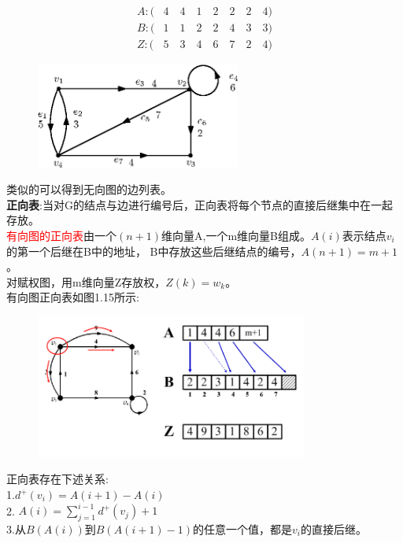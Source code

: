 \documentclass[11pt,a4paper,openany]{book}
\begin{document}
\begin{align}
  A:( & 4 \quad 4 \quad 1 \quad 2\quad 2 \quad 2 \quad 4)\\
  B:( & 1 \quad 1 \quad 2 \quad 2 \quad 4 \quad 3 \quad 3)\\
  Z:(&  5 \quad 3 \quad 4 \quad 6 \quad 7 \quad 2 \quad 4)
\end{align}
\begin{figure}[H]
  \centering
  \includegraphics[width=0.6\textwidth]{1_14.eps}\\
  \caption{}
\end{figure}
类似的可以得到无向图的边列表。\\
\noindent \textbf{正向表}:当对G的结点与边进行编号后，正向表将每个节点的直接后继集中在一起存放。\\
\indent \textcolor{red}{有向图的正向表}由一个$(n+1)$维向量A,一个m维向量B组成。$A(i)$表示结点$v_i$的第一个后继在B中的地址，
B中存放这些后继结点的编号，$A(n+1)=m+1$。\\
\indent 对赋权图，用m维向量Z存放权，$Z(k)=w_k$。\\
有向图正向表如图1.15所示:\\
\begin{figure}[H]
  \centering
  \includegraphics[width=0.8\textwidth]{1.15.png}\\
  \caption{}
\end{figure}
\begin{shaded}
正向表存在下述关系:\\
1.$d^{+}(v_i)=A(i+1)-A(i)$\\
2. $A(i)=\sum^{i-1}_{j=1}d^{+}(v_j)+1$\\
3.从$B(A(i))$到$B(A(i+1)-1)$的任意一个值，都是$v_i$的直接后继。
\end{shaded}
\end{document}

